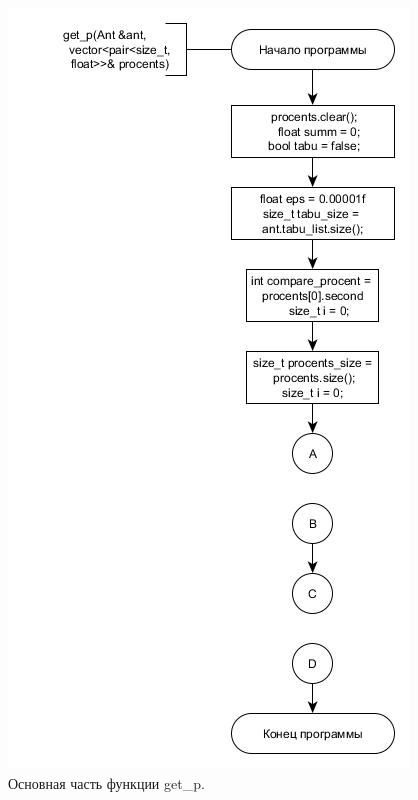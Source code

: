 \documentclass[a4paper, 14pt]{article}
\begin{document}
\begin{figure}[h!]
\center
\includegraphics[scale=0.6]{get_p_1_main.jpg}
\caption{Основная часть функции get\_p.}
\label{ris:get_p_1}
\end{figure}\newpage
\end{document}
